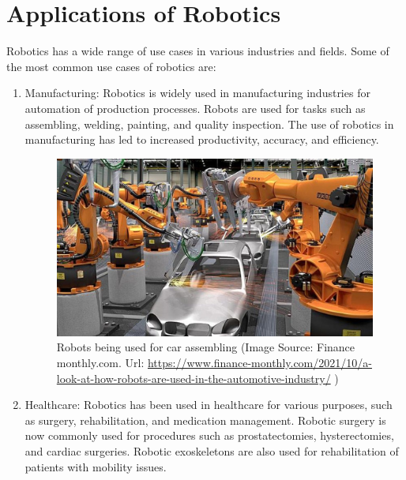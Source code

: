 \section{Applications of Robotics}
Robotics has a wide range of use cases in various industries and fields. Some of the most common use cases of robotics are:
\begin{enumerate}
    \item Manufacturing: Robotics is widely used in manufacturing industries for automation of production processes. Robots are used for tasks such as assembling, welding, painting, and quality inspection. The use of robotics in manufacturing has led to increased productivity, accuracy, and efficiency.

          \begin{figure}[H]
              \centering
              \includegraphics[scale=.225]{images/industral-robos.jpg}
              \caption[Car assembling robots]{Robots being used for car assembling (Image Source: Finance monthly.com. Url: \url{https://www.finance-monthly.com/2021/10/a-look-at-how-robots-are-used-in-the-automotive-industry/} \cite{financemonthly})}
          \end{figure}

    \item Healthcare: Robotics has been used in healthcare for various purposes, such as surgery, rehabilitation, and medication management. Robotic surgery is now commonly used for procedures such as prostatectomies, hysterectomies, and cardiac surgeries. Robotic exoskeletons are also used for rehabilitation of patients with mobility issues.


\end{enumerate}
